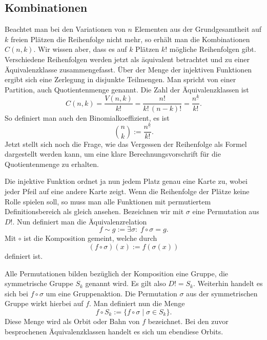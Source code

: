 \documentclass[a4paper,11pt,fleqn,twoside,twocolumn,dvipdfmx]{scrartcl}
\numberwithin{equation}{section}
\begin{document}
\subsection{Kombinationen}
Beachtet man bei den Variationen von $n$ Elementen aus der
Grundgesamtheit auf $k$ freien Plätzen die Reihenfolge nicht mehr,
so erhält man die Kombinationen $C(n,k)$. Wir wissen aber, dass
es auf $k$ Plätzen $k!$ mögliche Reihenfolgen gibt. Verschiedene
Reihenfolgen werden jetzt als äquivalent betrachtet und zu
einer Äquivalenzklasse zusammengefasst. Über der Menge der
injektiven Funktionen ergibt sich eine Zerlegung in disjunkte
Teilmengen. Man spricht von einer Partition, auch Quotientenmenge
genannt. Die Zahl der Äquivalenzklassen ist%
\begin{equation}
C(n,k) = \frac{V(n,k)}{k!} = \frac{n!}{k!\,(n-k)!}
= \frac{n^{\underline k}}{k!}.
\end{equation}
So definiert man auch den Binomialkoeffizient, es ist%
\begin{equation}
\binom{n}{k} := \frac{n^{\underline k}}{k!}.
\end{equation}
Jetzt stellt sich noch die Frage, wie das Vergessen der Reihenfolge
als Formel dargestellt werden kann, um eine klare
Berechnungsvorschrift für die Quotientenmenge zu erhalten.

Die injektive Funktion ordnet ja nun jedem Platz genau eine Karte
zu, wobei jeder Pfeil auf eine andere Karte zeigt. Wenn die
Reihenfolge der Plätze keine Rolle spielen soll, so muss man
alle Funktionen mit permutiertem Definitionsbereich als gleich
ansehen. Bezeichnen wir mit $\sigma$ eine Permutation
aus $D!$. Nun definiert man die Äquivalenzrelation%
\begin{equation}
f\sim g  := \exists \sigma{:}\; f\circ\sigma = g.
\end{equation}
Mit $\circ$ ist die Komposition gemeint, welche durch
\begin{equation}
(f\circ \sigma)(x) := f(\sigma(x))
\end{equation}
definiert ist.

Alle Permutationen bilden bezüglich der Komposition eine Gruppe,
die symmetrische Gruppe $S_k$ genannt wird. Es gilt also
$D!=S_k$. Weiterhin handelt es sich bei $f\circ\sigma$ um eine
Gruppenaktion. Die Permutation $\sigma$ aus der symmetrischen
Gruppe wirkt hierbei auf $f$. Man definiert nun die Menge%
\[f\circ S_k := \{f\circ\sigma\;|\;\sigma\in S_k\}.\]
Diese Menge wird als Orbit oder Bahn von $f$ bezeichnet.
Bei den zuvor besprochenen Äquivalenzklassen handelt es sich
um ebendiese Orbits.
\end{document}
